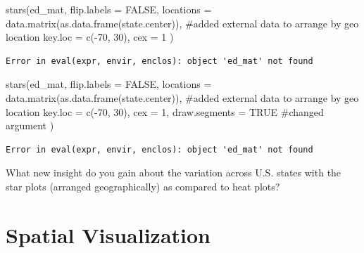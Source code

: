 \documentclass[
  letterpaper,
  DIV=11,
  numbers=noendperiod]{scrreprt}
\newenvironment{Shaded}{\begin{snugshade}}{\end{snugshade}}
\newcommand{\AttributeTok}[1]{\textcolor[rgb]{0.40,0.45,0.13}{#1}}
\newcommand{\CommentTok}[1]{\textcolor[rgb]{0.37,0.37,0.37}{#1}}
\newcommand{\ConstantTok}[1]{\textcolor[rgb]{0.56,0.35,0.01}{#1}}
\newcommand{\DecValTok}[1]{\textcolor[rgb]{0.68,0.00,0.00}{#1}}
\newcommand{\FunctionTok}[1]{\textcolor[rgb]{0.28,0.35,0.67}{#1}}
\newcommand{\NormalTok}[1]{\textcolor[rgb]{0.00,0.23,0.31}{#1}}
\newcommand{\SpecialCharTok}[1]{\textcolor[rgb]{0.37,0.37,0.37}{#1}}
\begin{document}
\begin{Shaded}
\begin{Highlighting}[]
\FunctionTok{stars}\NormalTok{(ed\_mat,}
  \AttributeTok{flip.labels =} \ConstantTok{FALSE}\NormalTok{,}
  \AttributeTok{locations =} \FunctionTok{data.matrix}\NormalTok{(}\FunctionTok{as.data.frame}\NormalTok{(state.center)), }\CommentTok{\#added external data to arrange by geo location}
  \AttributeTok{key.loc =} \FunctionTok{c}\NormalTok{(}\SpecialCharTok{{-}}\DecValTok{70}\NormalTok{, }\DecValTok{30}\NormalTok{), }\AttributeTok{cex =} \DecValTok{1}
\NormalTok{)}
\end{Highlighting}
\end{Shaded}

\begin{verbatim}
Error in eval(expr, envir, enclos): object 'ed_mat' not found
\end{verbatim}

\begin{Shaded}
\begin{Highlighting}[]
\FunctionTok{stars}\NormalTok{(ed\_mat,}
  \AttributeTok{flip.labels =} \ConstantTok{FALSE}\NormalTok{,}
  \AttributeTok{locations =} \FunctionTok{data.matrix}\NormalTok{(}\FunctionTok{as.data.frame}\NormalTok{(state.center)), }\CommentTok{\#added external data to arrange by geo location}
  \AttributeTok{key.loc =} \FunctionTok{c}\NormalTok{(}\SpecialCharTok{{-}}\DecValTok{70}\NormalTok{, }\DecValTok{30}\NormalTok{), }\AttributeTok{cex =} \DecValTok{1}\NormalTok{, }
  \AttributeTok{draw.segments =} \ConstantTok{TRUE} \CommentTok{\#changed argument}
\NormalTok{)}
\end{Highlighting}
\end{Shaded}

\begin{verbatim}
Error in eval(expr, envir, enclos): object 'ed_mat' not found
\end{verbatim}

\begin{Shaded}
\begin{Highlighting}[]
\NormalTok{What new insight do you gain about the variation across U.S. states with the star plots (arranged geographically) as compared to heat plots?}
\end{Highlighting}
\end{Shaded}

\chapter{Spatial Visualization}\label{spatial-visualization}
\end{document}
